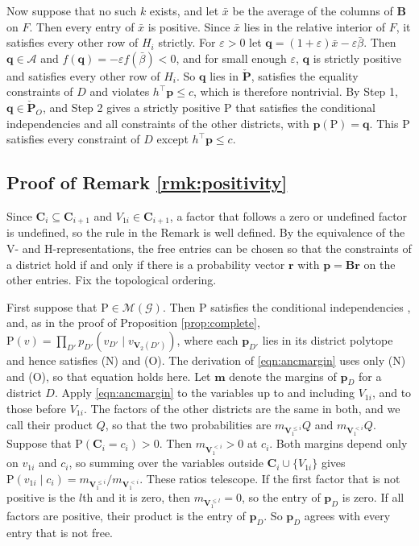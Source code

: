 \documentclass[12pt]{article}
\def\Pr{{\mathrm{P}}}
\newcommand{\bV}{\boldsymbol{V}}
\begin{document}
Now suppose that no such $k$ exists, and let $\bar x$ be the average of the columns of $\boldsymbol{B}$ on $F$. Then every entry of $\bar x$ is positive. Since $\bar x$ lies in the relative interior of $F$, it satisfies every other row of $H_i$ strictly. For $\varepsilon > 0$ let $\boldsymbol{q} = (1 + \varepsilon)\bar x - \varepsilon \bar\beta$. Then $\boldsymbol{q} \in \mathcal{A}$ and $f(\boldsymbol{q}) = -\varepsilon f(\bar\beta) < 0$, and for small enough $\varepsilon$, $\boldsymbol{q}$ is strictly positive and satisfies every other row of $H_i$. So $\boldsymbol{q}$ lies in $\boldsymbol{\check{P}}$, satisfies the equality constraints of $D$ and violates $h^\top \boldsymbol{p} \leq c$, which is therefore nontrivial. By Step 1, $\boldsymbol{q} \in \boldsymbol{\check{P}}_O$, and Step 2 gives a strictly positive $\Pr$ that satisfies the conditional independencies and all constraints of the other districts, with $\boldsymbol{p}(\Pr) = \boldsymbol{q}$. This $\Pr$ satisfies every constraint of $D$ except $h^\top \boldsymbol{p} \leq c$. 

\subsection*{Proof of Remark \ref{rmk:positivity}}

Since $\boldsymbol{C}_i \subseteq \boldsymbol{C}_{i+1}$ and $V_{1i} \in \boldsymbol{C}_{i+1}$, a factor that follows a zero or undefined factor is undefined, so the rule in the Remark is well defined. By the equivalence of the V- and H-representations, the free entries can be chosen so that the constraints of a district hold if and only if there is a probability vector $\boldsymbol{r}$ with $\boldsymbol{p} = \boldsymbol{B}\boldsymbol{r}$ on the other entries. Fix the topological ordering.

First suppose that $\Pr \in \mathcal{M}(\mathcal{G})$. Then $\Pr$ satisfies the conditional independencies \citep{evans2016graphs}, and, as in the proof of Proposition \ref{prop:complete}, $\Pr(v) = \prod_{D'} p_{D'}(v_{D'} \mid v_{\bV_2(D')})$, where each $\boldsymbol{p}_{D'}$ lies in its district polytope and hence satisfies (N) and (O). The derivation of \eqref{eqn:ancmargin} uses only (N) and (O), so that equation holds here. Let $\boldsymbol{m}$ denote the margins of $\boldsymbol{p}_D$ for a district $D$. Apply \eqref{eqn:ancmargin} to the variables up to and including $V_{1i}$, and to those before $V_{1i}$. The factors of the other districts are the same in both, and we call their product $Q$, so that the two probabilities are $m_{\bV_1^{\leq i}} Q$ and $m_{\bV_1^{<i}} Q$. Suppose that $\Pr(\boldsymbol{C}_i = c_i) > 0$. Then $m_{\bV_1^{<i}} > 0$ at $c_i$. Both margins depend only on $v_{1i}$ and $c_i$, so summing over the variables outside $\boldsymbol{C}_i \cup \{V_{1i}\}$ gives $\Pr(v_{1i} \mid c_i) = m_{\bV_1^{\leq i}} / m_{\bV_1^{<i}}$. These ratios telescope. If the first factor that is not positive is the $l$th and it is zero, then $m_{\bV_1^{\leq l}} = 0$, so the entry of $\boldsymbol{p}_D$ is zero. If all factors are positive, their product is the entry of $\boldsymbol{p}_D$. So $\boldsymbol{p}_D$ agrees with every entry that is not free.
\end{document}
